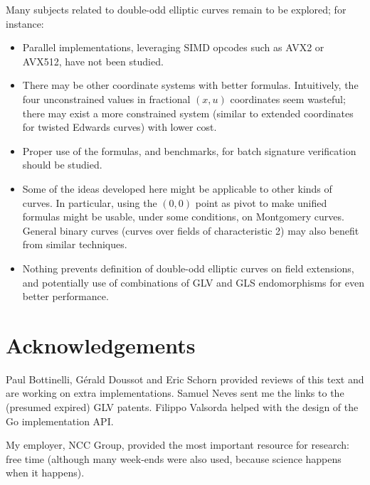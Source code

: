 \documentclass{llncs}
\begin{document}
Many subjects related to double-odd elliptic curves remain to be
explored; for instance:
\begin{itemize}

    \item Parallel implementations, leveraging SIMD opcodes such as
    AVX2 or AVX512, have not been studied.

    \item There may be other coordinate systems with better formulas.
    Intuitively, the four unconstrained values in fractional $(x, u)$
    coordinates seem wasteful; there may exist a more constrained system
    (similar to extended coordinates for twisted Edwards
    curves\cite{HisWonCarDaw2008}) with lower cost.

    \item Proper use of the formulas, and benchmarks, for batch signature
    verification should be studied.

    \item Some of the ideas developed here might be applicable to other
    kinds of curves. In particular, using the $(0, 0)$ point as pivot
    to make unified formulas might be usable, under some conditions,
    on Montgomery curves. General binary curves (curves over fields
    of characteristic 2) may also benefit from similar techniques.

    \item Nothing prevents definition of double-odd elliptic curves on
    field extensions, and potentially use of combinations of GLV and GLS
    endomorphisms\cite{GalLinSco2011} for even better performance.

\end{itemize}

\section*{Acknowledgements}

Paul Bottinelli, Gérald Doussot and Eric Schorn provided reviews of this
text and are working on extra implementations. Samuel Neves sent me the
links to the (presumed expired) GLV patents. Filippo Valsorda helped
with the design of the Go implementation API.

My employer, NCC Group, provided the most important resource for
research: free time (although many week-ends were also used, because
science happens when it happens).
\end{document}
